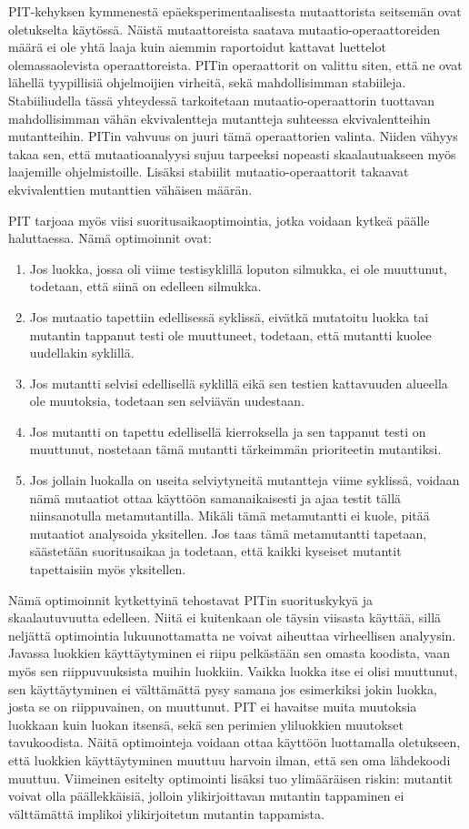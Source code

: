 \documentclass[finnish]{tktltiki2}
\begin{document}
PIT-kehyksen kymmenestä epäeksperimentaalisesta mutaattorista seitsemän ovat oletukselta käytössä. Näistä mutaattoreista saatava mutaatio-operaattoreiden määrä ei ole yhtä laaja kuin aiemmin raportoidut kattavat luettelot olemassaolevista operaattoreista. PITin operaattorit on valittu siten, että ne ovat lähellä tyypillisiä ohjelmoijien virheitä, sekä mahdollisimman stabiileja. Stabiiliudella tässä yhteydessä tarkoitetaan mutaatio-operaattorin tuottavan mahdollisimman vähän ekvivalentteja mutantteja suhteessa ekvivalentteihin mutantteihin. PITin vahvuus on juuri tämä operaattorien valinta. Niiden vähyys takaa sen, että mutaatioanalyysi sujuu tarpeeksi nopeasti skaalautuakseen myös laajemille ohjelmistoille. Lisäksi stabiilit mutaatio-operaattorit takaavat ekvivalenttien mutanttien vähäisen määrän.

PIT tarjoaa myös viisi suoritusaikaoptimointia, jotka voidaan kytkeä päälle haluttaessa. Nämä optimoinnit ovat:
\begin{enumerate}
	\item Jos luokka, jossa oli viime testisyklillä loputon silmukka, ei ole muuttunut, todetaan, että siinä on edelleen silmukka.
	\item Jos mutaatio tapettiin edellisessä syklissä, eivätkä mutatoitu luokka tai mutantin tappanut testi ole muuttuneet, todetaan, että mutantti kuolee uudellakin syklillä.
	\item Jos mutantti selvisi edellisellä syklillä eikä sen testien kattavuuden alueella ole muutoksia, todetaan sen selviävän uudestaan. 
	\item Jos mutantti on tapettu edellisellä kierroksella ja sen tappanut testi on muuttunut, nostetaan tämä mutantti tärkeimmän prioriteetin mutantiksi.
	\item Jos jollain luokalla on useita selviytyneitä mutantteja viime syklissä, voidaan nämä mutaatiot ottaa käyttöön samanaikaisesti ja ajaa testit tällä niinsanotulla metamutantilla. Mikäli tämä metamutantti ei kuole, pitää mutaatiot analysoida yksitellen. Jos taas tämä metamutantti tapetaan, säästetään suoritusaikaa ja todetaan, että kaikki kyseiset mutantit tapettaisiin myös yksitellen.
\end{enumerate}
Nämä optimoinnit kytkettyinä tehostavat PITin suorituskykyä ja skaalautuvuutta edelleen. Niitä ei kuitenkaan ole täysin viisasta käyttää, sillä neljättä optimointia lukuunottamatta ne voivat aiheuttaa virheellisen analyysin. Javassa luokkien käyttäytyminen ei riipu pelkästään sen omasta koodista, vaan myös sen riippuvuuksista muihin luokkiin. Vaikka luokka itse ei olisi muuttunut, sen käyttäytyminen ei välttämättä pysy samana jos esimerkiksi jokin luokka, josta se on riippuvainen, on muuttunut. PIT ei havaitse muita muutoksia luokkaan kuin luokan itsensä, sekä sen perimien yliluokkien muutokset tavukoodista. Näitä optimointeja voidaan ottaa käyttöön luottamalla oletukseen, että luokkien käyttäytyminen muuttuu harvoin ilman, että sen oma lähdekoodi muuttuu. Viimeinen esitelty optimointi lisäksi tuo ylimääräisen riskin: mutantit voivat olla päällekkäisiä, jolloin ylikirjoittavan mutantin tappaminen ei välttämättä implikoi ylikirjoitetun mutantin tappamista.
\end{document}
